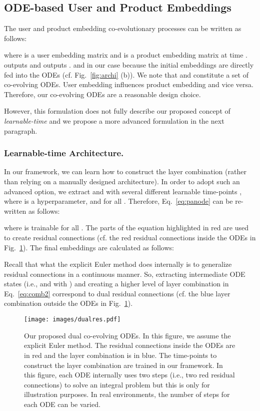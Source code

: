 \documentclass[sigconf]{acmart}
\begin{document}
\subsection{ODE-based User and Product Embeddings} The user and product embedding co-evolutionary processes can be written as follows:
\begin{linenomath*}\end{linenomath*}where  is a user embedding matrix and  is a product embedding matrix at time .  outputs  and  outputs .  and  in our case because the initial embeddings are directly fed into the ODEs (cf. Fig.~\ref{fig:archi} (b)). We note that  and  constitute a set of co-evolving ODEs. User embedding influences product embedding and vice versa. Therefore, our co-evolving ODEs are a reasonable design choice.

However, this formulation does not fully describe our proposed concept of \emph{learnable-time} and we propose a more advanced formulation in the next paragraph. 


\subsubsection{Learnable-time Architecture.} In our framework, we can learn how to construct the layer combination (rather than relying on a manually designed architecture). In order to adopt such an advanced option, we extract  and  with several different learnable time-points , where  is a hyperparameter, and  for all . Therefore, Eq.~\eqref{eq:panode} can be re-written as follows:
\begin{linenomath*}\end{linenomath*}where  is trainable for all . The parts of the equation highlighted in red are used to create residual connections (cf. the red residual connections inside the ODEs in Fig.~\ref{fig:dual}). The final embeddings are calculated as follows:
\begin{linenomath*}\end{linenomath*}

Recall that what the explicit Euler method does internally is to generalize residual connections in a continuous manner. So, extracting intermediate ODE states (i.e.,  and  with ) and creating a higher level of layer combination in Eq.~\eqref{eq:comb2} correspond to dual residual connections (cf. the blue layer combination outside the ODEs in Fig.~\ref{fig:dual}).



\begin{figure}[]
\centering
\texttt{[image: images/dualres.pdf]}
\caption{Our proposed dual co-evolving ODEs. In this figure, we assume the explicit Euler method. The residual connections inside the ODEs are in red and the layer combination is in blue. The time-points  to construct the layer combination are trained in our framework. In this figure, each ODE internally uses two steps (i.e., two red residual connections) to solve an integral problem but this is only for illustration purposes. In real environments, the number of steps for each ODE can be varied.} \label{fig:dual}
\end{figure}
\end{document}

